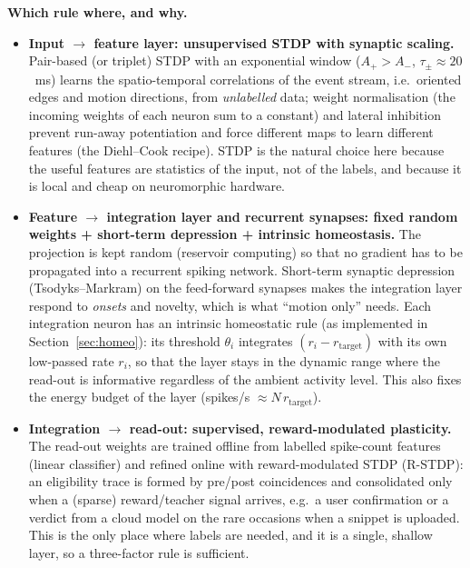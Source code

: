 \documentclass[11pt,a4paper]{article}
\begin{document}
\textbf{Which rule where, and why.}
\begin{itemize}
\item \textbf{Input $\to$ feature layer: unsupervised STDP with synaptic scaling.} Pair-based (or triplet) STDP with an exponential window ($A_+ > A_-$, $\tau_\pm\approx 20$~ms) learns the spatio-temporal correlations of the event stream, i.e.\ oriented edges and motion directions, from \emph{unlabelled} data; weight normalisation (the incoming weights of each neuron sum to a constant) and lateral inhibition prevent run-away potentiation and force different maps to learn different features (the Diehl--Cook recipe). STDP is the natural choice here because the useful features are statistics of the input, not of the labels, and because it is local and cheap on neuromorphic hardware.
\item \textbf{Feature $\to$ integration layer and recurrent synapses: fixed random weights + short-term depression + intrinsic homeostasis.} The projection is kept random (reservoir computing) so that no gradient has to be propagated into a recurrent spiking network. Short-term synaptic depression (Tsodyks--Markram) on the feed-forward synapses makes the integration layer respond to \emph{onsets} and novelty, which is what ``motion only'' needs. Each integration neuron has an intrinsic homeostatic rule (as implemented in Section~\ref{sec:homeo}): its threshold $\theta_i$ integrates $(r_i - r_{\mathrm{target}})$ with its own low-passed rate $r_i$, so that the layer stays in the dynamic range where the read-out is informative regardless of the ambient activity level. This also fixes the energy budget of the layer (spikes/s $\approx N\,r_{\mathrm{target}}$).
\item \textbf{Integration $\to$ read-out: supervised, reward-modulated plasticity.} The read-out weights are trained offline from labelled spike-count features (linear classifier) and refined online with reward-modulated STDP (R-STDP): an eligibility trace is formed by pre/post coincidences and consolidated only when a (sparse) reward/teacher signal arrives, e.g.\ a user confirmation or a verdict from a cloud model on the rare occasions when a snippet is uploaded. This is the only place where labels are needed, and it is a single, shallow layer, so a three-factor rule is sufficient.
\end{itemize}
\end{document}
